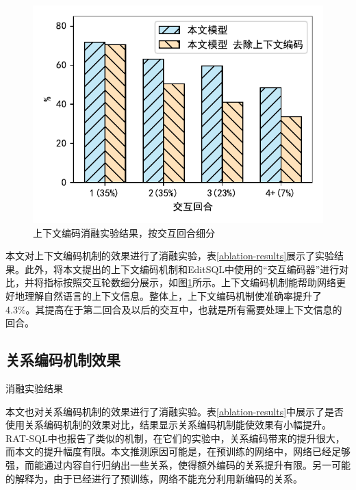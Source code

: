 \begin{figure}
    \includegraphics[width=\linewidth]{figure/prefix.pdf}
    \caption{上下文编码消融实验结果，按交互回合细分}
    \label{context-results}
\end{figure}

本文对上下文编码机制的效果进行了消融实验，表\ref{ablation-results}展示了实验结果。此外，将本文提出的上下文编码机制和EditSQL中使用的“交互编码器”进行对比，并将指标按照交互轮数细分展示，如图\ref{context-results}所示。上下文编码机制能帮助网络更好地理解自然语言的上下文信息。整体上，上下文编码机制使准确率提升了4.3\%。其提高在于第二回合及以后的交互中，也就是所有需要处理上下文信息的回合。

\subsection{关系编码机制效果}

\begin{table}
    \centering
    \caption{消融实验结果}
    
    \label{ablation-results}
\end{table}

本文也对关系编码机制的效果进行了消融实验。表\ref{ablation-results}中展示了是否使用关系编码机制的效果对比，结果显示关系编码机制能使效果有小幅提升。RAT-SQL\cite{ratsql19}中也报告了类似的机制，在它们的实验中，关系编码带来的提升很大，而本文的提升幅度有限。本文推测原因可能是，在预训练的网络中，网络已经足够强，而能通过内容自行归纳出一些关系，使得额外编码的关系提升有限。另一可能的解释为，由于已经进行了预训练，网络不能充分利用新编码的关系。

